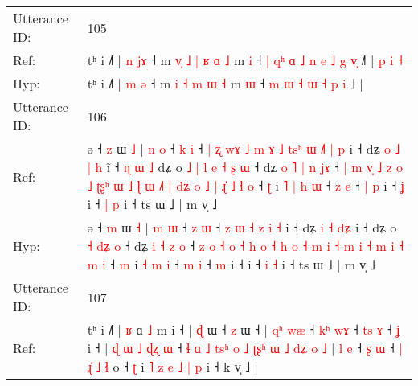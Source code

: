 \documentclass[10pt]{article}
\DeclareRobustCommand{\hl}[1]{{\textcolor{red}{#1}}}
\begin{document}
\begin{longtable}{ll}
 \\
\midrule
Utterance ID: & 105 \\
Ref: & tʰ i ˩˥ | \hl{n} \hl{j}\hl{ɤ} ˧ m\hl{ }\hl{v}\hl{̩} \hl{˩} \hl{|} \hl{ʁ} \hl{ɑ} \hl{˩} m \hl{i} ˧\hl{ }\hl{|}\hl{ }\hl{q}\hl{ʰ} \hl{ɑ} \hl{˩} \hl{n} \hl{e} \hl{˩} \hl{g} \hl{v}\hl{̩} ˩\hl{˥} |\hl{ }\hl{p}\hl{ }\hl{i}\hl{ }\hl{˧}
 \\
Hyp: & tʰ i ˩˥ | \hl{m} \hl{}\hl{ə} ˧ m\hl{}\hl{}\hl{} \hl{i} \hl{˧} \hl{m} \hl{ɯ} \hl{˧} m \hl{ɯ} ˧\hl{}\hl{}\hl{}\hl{}\hl{} \hl{m} \hl{ɯ} \hl{˧} \hl{ɯ} \hl{˧} \hl{p} \hl{}\hl{i} ˩\hl{} |\hl{}\hl{}\hl{}\hl{}\hl{}\hl{}
 \\
\midrule
Utterance ID: & 106 \\
Ref: & ə ˧ \hl{z} ɯ \hl{˩} | \hl{n} \hl{o} ˧ \hl{k} \hl{i} ˧\hl{ }\hl{|}\hl{ }\hl{ʐ}\hl{ }\hl{w}\hl{ɤ}\hl{ }\hl{˩}\hl{ }\hl{m}\hl{ }\hl{ɤ} \hl{˩} \hl{t}\hl{s}\hl{ʰ} \hl{ɯ} \hl{˩}\hl{˥} \hl{|} \hl{p} i ˧ dʑ \hl{o} \hl{˩} \hl{|}\hl{ }\hl{h} i\hl{̃} ˧\hl{ }\hl{ɳ}\hl{ }\hl{ɯ}\hl{ }\hl{˩} dʑ o\hl{ }\hl{˩}\hl{ }\hl{|}\hl{ }\hl{l} \hl{e} \hl{˧}\hl{ }\hl{ʂ} \hl{ɯ} ˧ dʑ\hl{ }\hl{o} \hl{˥} \hl{|} \hl{n} \hl{j}\hl{ɤ} ˧ \hl{|} \hl{m} \hl{v}\hl{̩} \hl{˩} \hl{z} \hl{o} \hl{˩} \hl{ʈ}\hl{ʂ}\hl{ʰ} \hl{ɯ} \hl{˩} \hl{ɭ} \hl{ɯ} \hl{˩}\hl{˥} \hl{|} \hl{d}\hl{ʑ} \hl{o} \hl{˩} \hl{|} \hl{ɻ}\hl{̍} \hl{˩} \hl{ɬ} \hl{o} ˧ \hl{ʈ} i\hl{ }\hl{˥} \hl{|} \hl{h} \hl{ɯ} ˧ \hl{z} \hl{e} ˧\hl{ }\hl{|} \hl{p} i ˧\hl{ }\hl{ʝ} i ˧ \hl{|} \hl{p} i ˧ ts ɯ ˩ | m v̩ ˩
 \\
Hyp: & ə ˧ \hl{m} ɯ \hl{˧} | \hl{m} \hl{ɯ} ˧ \hl{z} \hl{ɯ} ˧\hl{}\hl{}\hl{}\hl{}\hl{}\hl{}\hl{}\hl{}\hl{}\hl{}\hl{}\hl{}\hl{} \hl{z} \hl{}\hl{}\hl{ɯ} \hl{˧} \hl{}\hl{z} \hl{i} \hl{˧} i ˧ dʑ \hl{i} \hl{˧} \hl{}\hl{d}\hl{ʑ} i\hl{} ˧\hl{}\hl{}\hl{}\hl{}\hl{}\hl{} dʑ o\hl{}\hl{}\hl{}\hl{}\hl{}\hl{} \hl{˧} \hl{}\hl{d}\hl{ʑ} \hl{o} ˧ dʑ\hl{}\hl{} \hl{i} \hl{˧} \hl{z} \hl{}\hl{o} ˧ \hl{z} \hl{o} \hl{}\hl{˧} \hl{o} \hl{˧} \hl{h} \hl{o} \hl{}\hl{}\hl{˧} \hl{h} \hl{o} \hl{˧} \hl{m} \hl{}\hl{i} \hl{˧} \hl{}\hl{m} \hl{i} \hl{˧} \hl{m} \hl{}\hl{i} \hl{˧} \hl{m} \hl{i} ˧ \hl{m} i\hl{}\hl{} \hl{˧} \hl{m} \hl{i} ˧ \hl{m} \hl{i} ˧\hl{}\hl{} \hl{m} i ˧\hl{}\hl{} i ˧ \hl{i} \hl{˧} i ˧ ts ɯ ˩ | m v̩ ˩
 \\
\midrule
Utterance ID: & 107 \\
Ref: & tʰ i ˩˥ |\hl{ }\hl{ʁ} ɑ \hl{˩} m i ˧ |\hl{ }\hl{ɖ} ɯ ˧ \hl{z} ɯ ˧ |\hl{ }\hl{q}\hl{ʰ} \hl{w}\hl{æ} ˧ \hl{k}\hl{ʰ} \hl{w}\hl{ɤ} ˧ \hl{t}\hl{s} \hl{ɤ} ˧ \hl{ʝ} i ˧ |\hl{ }\hl{ɖ}\hl{ }\hl{ɯ}\hl{ }\hl{˩}\hl{ }\hl{ɖ}\hl{ʐ} \hl{ɯ} ˧\hl{ }\hl{ɬ}\hl{ }\hl{ɑ}\hl{ }\hl{˩}\hl{ }\hl{t}\hl{s}\hl{ʰ}\hl{ }\hl{o}\hl{ }\hl{˩} \hl{ʈ}\hl{ʂ}\hl{ʰ} \hl{ɯ} \hl{˩} \hl{d}\hl{ʑ} \hl{o} \hl{˩} |\hl{ }\hl{l} \hl{e} ˧ \hl{ʂ} \hl{ɯ} ˧ \hl{|} \hl{ɻ}\hl{̍} \hl{˩} \hl{ɬ} o ˧ \hl{ʈ} i\hl{ }\hl{˥}\hl{ }\hl{z} \hl{e} \hl{˩} \hl{|} \hl{p} i ˧ k v̩ ˩ |

\end{longtable}
\end{document}
